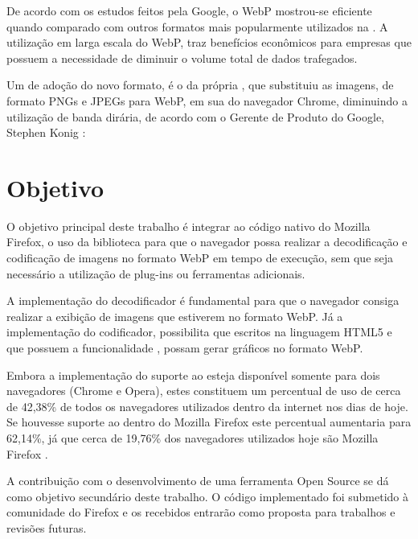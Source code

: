 \documentclass[espaco=simples,appendix=Name]{abnt}
\begin{document}
De acordo com os estudos feitos pela Google, o WebP mostrou-se eficiente quando comparado com outros formatos mais popularmente utilizados na . A utilização em larga escala do WebP, traz benefícios econômicos para empresas que possuem a necessidade de diminuir o volume total de dados trafegados.

Um  de adoção do novo formato, é o da própria , que substituiu as imagens, de formato PNGs e JPEGs para WebP, em sua  do navegador Chrome, diminuindo a utilização de banda dirária, de acordo com o Gerente de Produto do Google, Stephen Konig \cite{ChromiumBlog}:
\begin{citacao}
\end{citacao}

\section{Objetivo}

O objetivo principal deste trabalho é integrar ao código nativo do Mozilla Firefox, o uso da biblioteca  para que o navegador possa realizar a decodificação e codificação de imagens no formato WebP em tempo de execução, sem que seja necessário a utilização de plug-ins ou ferramentas adicionais.

A implementação do decodificador é fundamental para que o navegador consiga realizar a exibição de imagens que estiverem no formato WebP. Já a implementação do codificador, possibilita que  escritos na linguagem HTML5 e que possuem a funcionalidade , possam gerar gráficos no formato WebP.

Embora a implementação do suporte ao  esteja disponível somente para dois navegadores (Chrome e Opera), estes constituem um percentual de uso de cerca de 42,38\% de todos os navegadores utilizados dentro da internet nos dias de hoje. Se houvesse suporte ao  dentro do Mozilla Firefox este percentual aumentaria para 62,14\%, já que cerca de 19,76\% dos navegadores utilizados hoje são Mozilla Firefox \cite{BrowserStats}.

A contribuição com o desenvolvimento de uma ferramenta Open Source se dá como objetivo secundário deste trabalho. O código implementado foi submetido à comunidade do Firefox e os  recebidos entrarão como proposta para trabalhos e revisões futuras.
\end{document}
